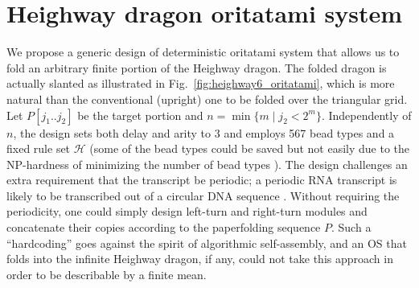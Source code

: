	\section{Heighway dragon oritatami system}



We propose a generic design of deterministic oritatami system that allows us to fold an arbitrary finite portion of the Heighway dragon. 
The folded dragon is actually slanted as illustrated in Fig.~\ref{fig:heighway6_oritatami}, which is more natural than the conventional (upright) one to be folded over the triangular grid. 
Let $P[j_1 .. j_2]$ be the target portion and $n = \min\{m \mid j_2 < 2^m\}$. 
Independently of $n$, the design sets both delay and arity to 3 and employs 567 bead types and a fixed rule set $\mathcal{H}$ (some of the bead types could be saved but not easily due to the NP-hardness of minimizing the number of bead types \cite{HanKim2017}). 
The design challenges an extra requirement that the transcript be periodic; a periodic RNA transcript is likely to be transcribed out of a circular DNA sequence \cite{GearyAndersen2014}. 
Without requiring the periodicity, one could simply design left-turn and right-turn modules and concatenate their copies according to the paperfolding sequence $P$. 
Such a ``hardcoding'' goes against the spirit of algorithmic self-assembly, and an OS that folds into the infinite Heighway dragon, if any, could not take this approach in order to be describable by a finite mean. 



